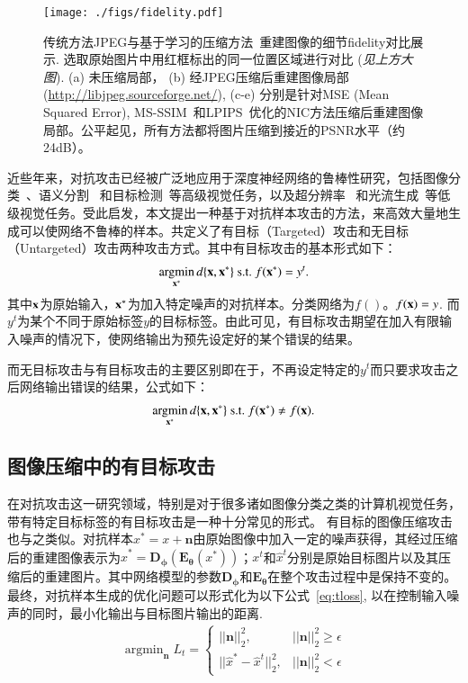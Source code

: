 \documentclass[macfonts,phd,oneside,nobackinfo]{njuthesis}
\begin{document}
\begin{figure}[t]
\centering
\texttt{[image: ./figs/fidelity.pdf]}
\caption{传统方法JPEG与基于学习的压缩方法~\cite{xxx}重建图像的细节fidelity对比展示.
选取原始图片中用红框标出的同一位置区域进行对比 ({\it 见上方大图}). (a) 未压缩局部， (b) 经JPEG压缩后重建图像局部(\url{http://libjpeg.sourceforge.net/}), (c-e) 分别是针对MSE (Mean Squared Error), MS-SSIM~\cite{MS-SSIM}和LPIPS~\cite{zhang2018unreasonable}优化的NIC方法压缩后重建图像局部。公平起见，所有方法都将图片压缩到接近的PSNR水平（约24dB）。}
\label{fidelity}
\end{figure}

近些年来，对抗攻击已经被广泛地应用于深度神经网络的鲁棒性研究，包括图像分类~\cite{43405,nguyen2015deep}、语义分割~\cite{Xiao_2018_ECCV} 和目标检测~\cite{ijcai2019-134}等高级视觉任务，以及超分辨率~\cite{yin2018sr} 和光流生成~\cite{ranjan2019attacking}等低级视觉任务。受此启发，本文提出一种基于对抗样本攻击的方法，来高效大量地生成可以使网络不鲁棒的样本。共定义了有目标（Targeted）攻击和无目标（Untargeted）攻击两种攻击方式。其中有目标攻击的基本形式如下：
\begin{align}
\mathop{\arg\!\min}_{{\bf x}^{\ast}} {d}\{{\bf x},{\bf x}^{\ast}\} \ \text{s.t.} \ f({\bf x}^{\ast}) = y^t. \label{eq:targeted_attack}
\end{align}
其中$\bf x$为原始输入，${\bf x}^{\ast}$为加入特定噪声的对抗样本。分类网络为$f()$。$f({\bf x}) = y$. 而$y^t$为某个不同于原始标签$y$的目标标签。由此可见，有目标攻击期望在加入有限输入噪声的情况下，使网络输出为预先设定好的某个错误的结果。

而无目标攻击与有目标攻击的主要区别即在于，不再设定特定的$y^t$而只要求攻击之后网络输出错误的结果，公式如下：
\begin{align}
\mathop{\arg\!\min}_{{\bf x}^{\ast}} {d}\{{\bf x},{\bf x}^{\ast}\}  \ \text{s.t.} \ f({\bf x}^{\ast}) \neq f({\bf x}). \label{eq:untargeted_attack}
\end{align}

\subsection{图像压缩中的有目标攻击}
在对抗攻击这一研究领域，特别是对于很多诸如图像分类之类的计算机视觉任务，带有特定目标标签的有目标攻击是一种十分常见的形式。 有目标的图像压缩攻击也与之类似。对抗样本$x^*=x+\mathbf{n}$由原始图像中加入一定的噪声获得，其经过压缩后的重建图像表示为$\hat{x}^* = \mathbf{D_{\phi}}(\mathbf{E_{\theta}}(x^*))$；$x^t$和$\hat{x}^t$分别是原始目标图片以及其压缩后的重建图片。其中网络模型的参数$\mathbf{D_{\phi}}$和$\mathbf{E_{\theta}}$在整个攻击过程中是保持不变的。 最终，对抗样本生成的优化问题可以形式化为以下公式~\eqref{eq:tloss}, 以在控制输入噪声的同时，最小化输出与目标图片输出的距离. 
\begin{align}
    \mathop{\arg\min}_{\mathbf{n}}{L_{t}} =\left\{ \begin{array}{lc}
        ||\mathbf{n}||_2^2, & ||\mathbf{n}||_2^2 \geq \epsilon \\
        ||\hat{x}^{*}-\hat{x}^{t}||_2^2, & ||\mathbf{n}||_2^2 < \epsilon
    \end{array}
    \right.
    \label{eq:tloss}
\end{align}
\end{document}
